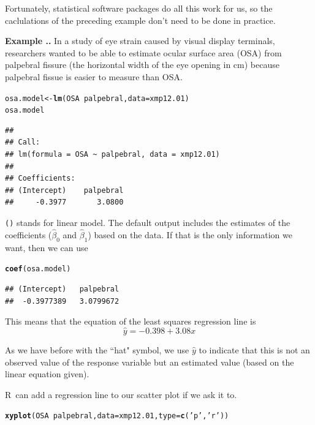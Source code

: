 \documentclass[twoside]{book}\usepackage[]{graphicx}\usepackage[]{xcolor}
\makeatletter
\newcommand{\hlstr}[1]{\textcolor[rgb]{0.192,0.494,0.8}{#1}}%
\newcommand{\hlopt}[1]{\textcolor[rgb]{0,0,0}{#1}}%
\newcommand{\hlstd}[1]{\textcolor[rgb]{0.345,0.345,0.345}{#1}}%
\newcommand{\hlkwb}[1]{\textcolor[rgb]{0.69,0.353,0.396}{#1}}%
\newcommand{\hlkwc}[1]{\textcolor[rgb]{0.333,0.667,0.333}{#1}}%
\newcommand{\hlkwd}[1]{\textcolor[rgb]{0.737,0.353,0.396}{\textbf{#1}}}%
\newenvironment{kframe}{%
 \def\at@end@of@kframe{}%
 \ifinner\ifhmode%
  \def\at@end@of@kframe{\end{minipage}}%
  \begin{minipage}{\columnwidth}%
 \fi\fi%
 \def\FrameCommand##1{\hskip\@totalleftmargin \hskip-\fboxsep
 \colorbox{shadecolor}{##1}\hskip-\fboxsep
     \hskip-\linewidth \hskip-\@totalleftmargin \hskip\columnwidth}%
 \MakeFramed {\advance\hsize-\width
   \@totalleftmargin\z@ \linewidth\hsize
   \@setminipage}}%
 {\par\unskip\endMakeFramed%
 \at@end@of@kframe}
\newenvironment{knitrout}{}{} %
\newcommand{\Rindex}[1]{\index{\texttt{#1}}}
\newcommand{\function}[1]{{\color{purple!75!blue}\texttt{\StrSubstitute{#1}{()}{}()}}\Rindex{#1}}
\def\R{{\sf R}}
\newcounter{example}[section]
\newenvironment{example}%
{\refstepcounter{example}%
\textbf{Example \thesection.\arabic{example}. }}%
{}
\makeatother
\begin{document}
Fortunately, statistical software packages do all this work for us, so the
caclulations of the preceding example don't need to be done in practice.

\begin{example}
In a study of eye strain caused by visual display terminals, researchers wanted
to be able to estimate ocular surface area (OSA) from palpebral fissure (the
horizontal width of the eye opening in cm) because palpebral fissue is easier
to measure than OSA.
\begin{knitrout}
\color{fgcolor}\begin{kframe}
\begin{alltt}
\hlstd{osa.model} \hlkwb{<-} \hlkwd{lm}\hlstd{( OSA} \hlopt{~} \hlstd{palpebral,} \hlkwc{data}\hlstd{=xmp12.01)}
\hlstd{osa.model}
\end{alltt}
\begin{verbatim}
## 
## Call:
## lm(formula = OSA ~ palpebral, data = xmp12.01)
## 
## Coefficients:
## (Intercept)    palpebral  
##     -0.3977       3.0800
\end{verbatim}
\end{kframe}
\end{knitrout}
\function{lm()} stands for linear model.  The default output includes the estimates
of the coefficients ($\hat\beta_0$ and $\hat \beta_1$) based on the data.  If that is the 
only information we want, then we can use 
\begin{knitrout}
\color{fgcolor}\begin{kframe}
\begin{alltt}
\hlkwd{coef}\hlstd{(osa.model)}
\end{alltt}
\begin{verbatim}
## (Intercept)   palpebral 
##  -0.3977389   3.0799672
\end{verbatim}
\end{kframe}
\end{knitrout}

This means that the equation of the least squares regression line is 
\[
\hat y = -0.398 + 3.08 x
\]

As we have before with the ``hat" symbol, we use $\hat y$ to indicate that this is not an observed value of the response variable
but an estimated value (based on the linear equation given).

\R\ can add a regression line to our scatter plot if we ask it to.
\begin{center}
\begin{knitrout}
\color{fgcolor}\begin{kframe}
\begin{alltt}
\hlkwd{xyplot}\hlstd{( OSA} \hlopt{~} \hlstd{palpebral,} \hlkwc{data}\hlstd{=xmp12.01,} \hlkwc{type}\hlstd{=}\hlkwd{c}\hlstd{(}\hlstr{'p'}\hlstd{,}\hlstr{'r'}\hlstd{) )}
\end{alltt}
\end{kframe}


\end{knitrout}
\end{center}
\end{example}
\end{document}

